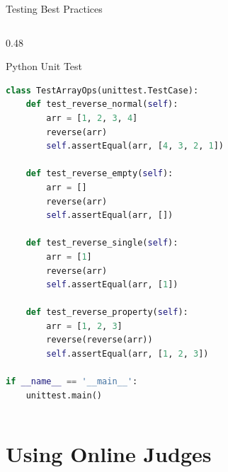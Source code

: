 \documentclass[aspectratio=169,xcolor=dvipsnames]{beamer}
\begin{document}
\begin{frame}[fragile]{Testing Best Practices}
\begin{columns}
\begin{column}{0.48\textwidth}
\begin{exampleblock}{Python Unit Test}
\begin{lstlisting}[language=Python,basicstyle=\tiny\ttfamily]
class TestArrayOps(unittest.TestCase):
    def test_reverse_normal(self):
        arr = [1, 2, 3, 4]
        reverse(arr)
        self.assertEqual(arr, [4, 3, 2, 1])

    def test_reverse_empty(self):
        arr = []
        reverse(arr)
        self.assertEqual(arr, [])

    def test_reverse_single(self):
        arr = [1]
        reverse(arr)
        self.assertEqual(arr, [1])

    def test_reverse_property(self):
        arr = [1, 2, 3]
        reverse(reverse(arr))
        self.assertEqual(arr, [1, 2, 3])

if __name__ == '__main__':
    unittest.main()
        \end{lstlisting}
      \end{exampleblock}
    \end{column}
  \end{columns}
\end{frame}

\section{Using Online Judges}
\end{document}
